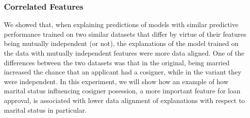 \documentclass[mnsc,blindrev]{informs3}
\def\checkmark{\tikz\fill[scale=0.4](0,.35) -- (.25,0) -- (1,.7) -- (.25,.15) -- cycle;}
\begin{document}
            
        \subsubsection{Correlated Features}
            We showed that, when explaining predictions of models with similar predictive performance trained on two similar datasets that differ by virtue of their features being mutually independent (or not), the explanations of the model trained on the data with mutually independent features were more data aligned. One of the differences between the two datasets was that in the original, being married increased the chance that an applicant had a cosigner, while in the variant they were independent. In this experiment, we will show how an example of how marital status influencing cosigner posession, a more important feature for loan approval, is associated with lower data alignment of explanations with respect to marital status in particular.
        
\end{document}
